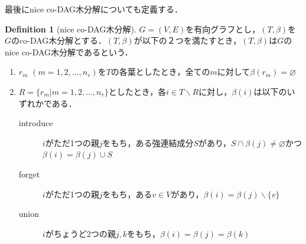\documentclass[master]{kuisthesis}		%
\theoremstyle{plain}
\theoremstyle{definition}
\newtheorem{definition*}{Definition}
\begin{document}

最後にnice co-DAG木分解についても定義する．

\begin{definition*}[nice co-DAG木分解]
 $G=(V, E)$を有向グラフとし，$(T, \beta)$を$G$のco-DAG木分解とする．$(T, \beta)$が以下の２つを満たすとき，$(T, \beta)$は$G$のnice co-DAG木分解であるという．
 
\begin{enumerate}
    \item $r_m$ $(m = 1, 2, \dots, n_r)$を$T$の各葉としたとき，全ての$m$に対して$\beta(r_m) = \varnothing$ 
    \item $R = \{r_m | m = 1, 2, \dots, n_r\}$としたとき，各$i \in T \backslash R$に対し，$\beta(i)$は以下のいずれかである．
    \begin{description}
          \item[introduce] $i$がただ1つの親$j$をもち，ある強連結成分$S$があり，$S \cap \beta(j) \neq \varnothing$かつ$\beta(i) = \beta(j) \cup S$
          \item[forget] $i$がただ1つの親$j$をもち，ある$v \in V$があり，$\beta(i) = \beta(j) \backslash \{v\}$
          \item[union] $i$がちょうど2つの親$j, k$をもち，$\beta(i) = \beta(j) = \beta(k)$
    \end{description}
    \end{enumerate}
\end{definition*}
\end{document}
